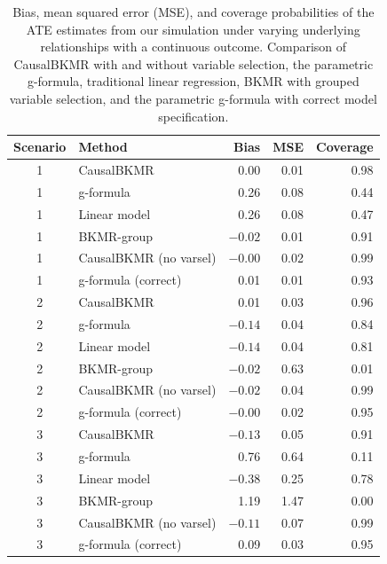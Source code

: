 \begin{table}[h]
\centering
\caption{Bias, mean squared error (MSE), and coverage probabilities of the ATE estimates from our simulation under varying underlying relationships with a continuous outcome. Comparison of CausalBKMR with and without variable selection, the parametric g-formula, traditional linear regression, BKMR with grouped variable selection, and the parametric g-formula with correct model specification.}
\label{tab:sim_continuous}
\begin{tabular}{cl rrr}
\toprule
Scenario & Method & Bias & MSE & Coverage \\
\midrule
1 & CausalBKMR              &  0.00 & 0.01 & 0.98 \\
1 & g-formula               &  0.26 & 0.08 & 0.44 \\
1 & Linear model            &  0.26 & 0.08 & 0.47 \\
1 & BKMR-group              & $-0.02$ & 0.01 & 0.91 \\
1 & CausalBKMR (no varsel)  & $-0.00$ & 0.02 & 0.99 \\
1 & g-formula (correct)     &  0.01 & 0.01 & 0.93 \\
\midrule
2 & CausalBKMR              &  0.01 & 0.03 & 0.96 \\
2 & g-formula               & $-0.14$ & 0.04 & 0.84 \\
2 & Linear model            & $-0.14$ & 0.04 & 0.81 \\
2 & BKMR-group              & $-0.02$ & 0.63 & 0.01 \\
2 & CausalBKMR (no varsel)  & $-0.02$ & 0.04 & 0.99 \\
2 & g-formula (correct)     & $-0.00$ & 0.02 & 0.95 \\
\midrule
3 & CausalBKMR              & $-0.13$ & 0.05 & 0.91 \\
3 & g-formula               &  0.76 & 0.64 & 0.11 \\
3 & Linear model            & $-0.38$ & 0.25 & 0.78 \\
3 & BKMR-group              &  1.19 & 1.47 & 0.00 \\
3 & CausalBKMR (no varsel)  & $-0.11$ & 0.07 & 0.99 \\
3 & g-formula (correct)     &  0.09 & 0.03 & 0.95 \\
\bottomrule
\end{tabular}
\end{table}


